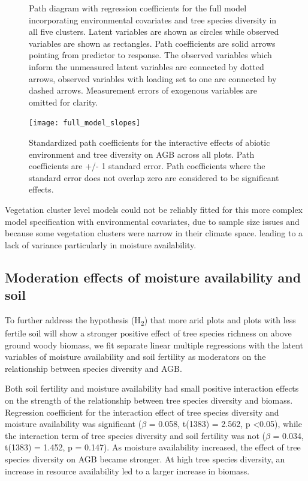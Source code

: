 \documentclass[11pt,a4paper]{article}
\begin{document}
\begin{figure}[H]
\centering
	
	\caption{Path diagram with regression coefficients for the full model incorporating environmental covariates and tree species diversity in all five clusters. Latent variables are shown as circles while observed variables are shown as rectangles. Path coefficients are solid arrows pointing from predictor to response. The observed variables which inform the unmeasured latent variables are connected by dotted arrows, observed variables with loading set to one are connected by dashed arrows. Measurement errors of exogenous variables are omitted for clarity.}
	\label{full_mod}
\end{figure}

\begin{figure}[H]
\centering
	\texttt{[image: full\_model\_slopes]}
	\caption{Standardized path coefficients for the interactive effects of abiotic environment and tree diversity on AGB across all plots. Path coefficients are +/- 1 standard error. Path coefficients where the standard error does not overlap zero are considered to be significant effects.}
	\label{full_model_slopes}
\end{figure}


Vegetation cluster level models could not be reliably fitted for this more complex model specification with environmental covariates, due to sample size issues and because some vegetation clusters were narrow in their climate space. leading to a lack of variance particularly in moisture availability.


\subsection{Moderation effects of moisture availability and soil}

To further address the hypothesis (H\textsubscript{2}) that more arid plots and plots with less fertile soil will show a stronger positive effect of tree species richness on above ground woody biomass, we fit separate linear multiple regressions with the latent variables of moisture availability and soil fertility as moderators on the relationship between species diversity and AGB.

Both soil fertility and moisture availability had small positive interaction effects on the strength of the relationship between tree species diversity and biomass. Regression coefficient for the interaction effect of tree species diversity and moisture availability was significant ($\beta$ = 0.058, t(1383) = 2.562, p <0.05), while the interaction term of tree species diversity and soil fertility was not ($\beta$ = 0.034, t(1383) = 1.452, p = 0.147). As moisture availability increased, the effect of tree species diversity on AGB became stronger. At high tree species diversity, an increase in resource availability led to a larger increase in biomass.
\end{document}
